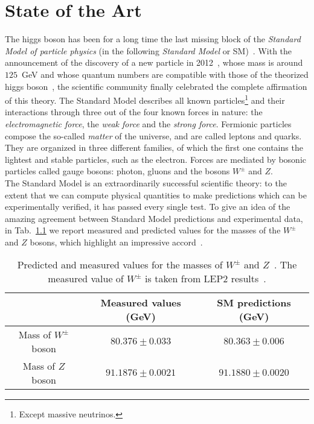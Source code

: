 \documentclass[12pt,a4paper]{book}
\begin{document}
\chapter{State of the Art}
\label{chap:StateOfArt}

\raggedbottom

The higgs boson has been for a long time the last missing block of the \textit{Standard Model of particle physics} (in the following \textit{Standard Model} or SM)~\cite{Agashe:2014kda}. With the announcement of the discovery of a new particle in 2012~\cite{Aad:2012tfa, Chatrchyan:2012xdj}, whose mass is around $125 \,$ GeV and whose quantum numbers are compatible with those of the theorized higgs boson~\cite{Higgs:1964pj}, the scientific community finally celebrated the complete affirmation of this theory. The Standard Model describes all known particles\footnote{Except massive neutrinos.} and their interactions through three out of the four known forces in nature: the \textit{electromagnetic force}, the \textit{weak force} and the \textit{strong force}. Fermionic particles compose the so-called \textit{matter} of the universe, and are called leptons and quarks. They are organized in three different families, of which the first one contains the lightest and stable particles, such as the electron. Forces are mediated by bosonic particles called gauge bosons: photon, gluons and the bosons $W^\pm$ and $Z$.\\

The Standard Model is an extraordinarily successful scientific theory: to the extent that we can compute physical quantities to make predictions which can be experimentally verified, it has passed every single test. To give an idea of the amazing agreement between Standard Model predictions and experimental data, in Tab.~\ref{tab:BosonMasses} we report measured and predicted values for the masses of the $W^\pm$ and $Z$ bosons, which highlight an impressive accord~\cite{Agashe:2014kda}.\\
\begin{table}[h!]
\begin{center}
\begin{tabular}{ccc}
\hline
 & Measured values (GeV) & SM predictions (GeV) \\
\hline
Mass of $W^\pm$ boson & $80.376 \pm 0.033$ & $80.363 \pm 0.006$ \\
\hline
Mass of $Z$ boson & $91.1876 \pm 0.0021$ & $91.1880 \pm 0.0020$ \\
\hline
\end{tabular}
\end{center}
\caption{Predicted and measured values for the masses of $W^\pm$ and $Z$~\cite{Agashe:2014kda}. The measured value of $W^\pm$ is taken from LEP2 results~\cite{Schael:2013ita}.}
\label{tab:BosonMasses}
\end{table}
\end{document}
